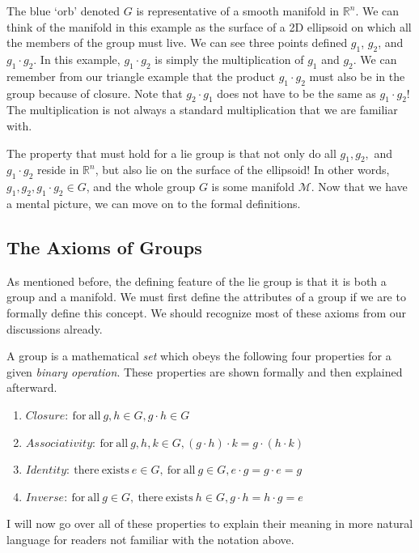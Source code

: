 The blue `orb' denoted $G$ is representative of a smooth manifold in $\mathbb{R}^n$. We can think of the manifold in this example as the surface of a 2D ellipsoid on which all the members of the group must live. We can see three points defined $g_1$, $g_2$, and $g_1\cdot g_2$. In this example, $g_1\cdot g_2$ is simply the multiplication of $g_1$ and $g_2$. We can remember from our triangle example that the product $g_1\cdot g_2$ must also be in the group because of closure. Note that $g_2\cdot g_1$ does not have to be the same as $g_1\cdot g_2$! The multiplication is not always a standard multiplication that we are familiar with.

The property that must hold for a \gls{lie group} is that not only do all $g_1,g_2,$ and $g_1\cdot g_2$ reside in $\mathbb{R}^n$, but also lie on the surface of the ellipsoid! In other words, $g_1,g_2,g_1\cdot g_2\in G$, and the whole group $G$ is some manifold $\mathcal{M}$. Now that we have a mental picture, we can move on to the formal definitions.

\subsection{The Axioms of Groups}
As mentioned before, the defining feature of the \gls{lie group} is that it is both a group and a manifold. We must first define the attributes of a group if we are to formally define this concept. We should recognize most of these axioms from our discussions already.

A group is a mathematical \textit{set} which obeys the following four properties for a given \textit{binary operation}. These properties are shown formally and then explained afterward.

\begin{enumerate}
\item $Closure{:} \mathrm{\ for \ all\ } g,h \in G, g\cdot h \in G$
\item $Associativity{:} \mathrm{\ for \ all \ } g,h,k \in  G, (g\cdot h)\cdot k=g\cdot(h\cdot k)$
\item $Identity{:} \mathrm{\ there \ exists  \ } e\in G, \mathrm{\ for \ all \ } g \in G, e\cdot g=g\cdot e=g$
\item $Inverse{:} \mathrm{\ for \ all \ } g \in G, \mathrm{\ there \ exists  \ } h \in G, g \cdot h=h\cdot g =e$
\end{enumerate}
I will now go over all of these properties to explain their meaning in more natural language for readers not familiar with the notation above.

